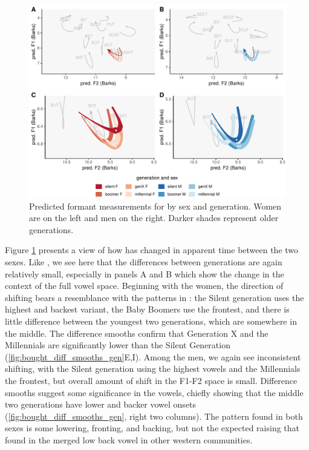 \begin{figure}[tb!]
	\centering
	\includegraphics[width = 6.5in]{Figures/BOUGHT/BOUGHT_four_panel_plot.pdf}
	\caption[Predicted formant measurements for \thought by sex and generation.]{Predicted formant measurements for \thought by sex and generation. Women are on the left and men on the right. Darker shades represent older generations.}
	\label{fig:BOUGHT_four_panel}
\end{figure}

Figure \ref{fig:BOUGHT_four_panel} presents a view of how \thought has changed in apparent time between the two sexes. Like \lot, we see here that the differences between generations are again relatively small, especially in panels A and B which show the change in the context of the full vowel space. Beginning with the women, the direction of shifting bears a resemblance with the patterns in \lot: the Silent generation uses the highest and backest variant, the Baby Boomers use the frontest, and there is little difference between the youngest two generations, which are somewhere in the middle. The difference smooths confirm that Generation X and the Millennials are significantly lower than the Silent Generation (\ref{fig:bought_diff_smooths_gen}E,I). Among the men, we again see inconsistent shifting, with the Silent generation using the highest vowels and the Millennials the frontest, but overall amount of shift in the F1-F2 space is small. Difference smooths suggest some significance in the vowels, chiefly showing that the middle two generations have lower and backer vowel onsets (\ref{fig:bought_diff_smooths_gen}, right two columns). The pattern found in both sexes is some lowering, fronting, and backing, but not the expected raising that found in the merged low back vowel in other western communities.

